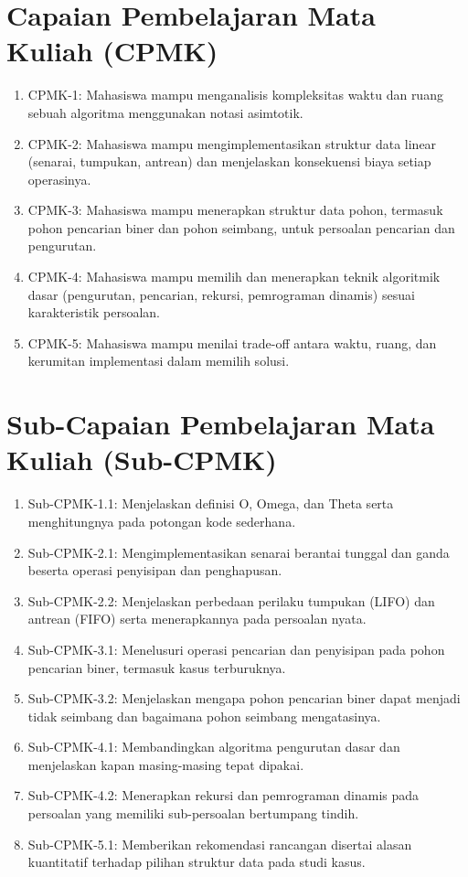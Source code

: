 \section*{Capaian Pembelajaran Mata Kuliah (CPMK)}

\begin{enumerate}
  \item CPMK-1: Mahasiswa mampu menganalisis kompleksitas waktu dan ruang
        sebuah algoritma menggunakan notasi asimtotik.
  \item CPMK-2: Mahasiswa mampu mengimplementasikan struktur data linear
        (senarai, tumpukan, antrean) dan menjelaskan konsekuensi biaya setiap
        operasinya.
  \item CPMK-3: Mahasiswa mampu menerapkan struktur data pohon, termasuk
        pohon pencarian biner dan pohon seimbang, untuk persoalan pencarian
        dan pengurutan.
  \item CPMK-4: Mahasiswa mampu memilih dan menerapkan teknik algoritmik
        dasar (pengurutan, pencarian, rekursi, pemrograman dinamis) sesuai
        karakteristik persoalan.
  \item CPMK-5: Mahasiswa mampu menilai trade-off antara waktu, ruang, dan
        kerumitan implementasi dalam memilih solusi.
\end{enumerate}

\section*{Sub-Capaian Pembelajaran Mata Kuliah (Sub-CPMK)}

\begin{enumerate}
  \item Sub-CPMK-1.1: Menjelaskan definisi O, Omega, dan Theta serta
        menghitungnya pada potongan kode sederhana.
  \item Sub-CPMK-2.1: Mengimplementasikan senarai berantai tunggal dan ganda
        beserta operasi penyisipan dan penghapusan.
  \item Sub-CPMK-2.2: Menjelaskan perbedaan perilaku tumpukan (LIFO) dan
        antrean (FIFO) serta menerapkannya pada persoalan nyata.
  \item Sub-CPMK-3.1: Menelusuri operasi pencarian dan penyisipan pada pohon
        pencarian biner, termasuk kasus terburuknya.
  \item Sub-CPMK-3.2: Menjelaskan mengapa pohon pencarian biner dapat menjadi
        tidak seimbang dan bagaimana pohon seimbang mengatasinya.
  \item Sub-CPMK-4.1: Membandingkan algoritma pengurutan dasar dan
        menjelaskan kapan masing-masing tepat dipakai.
  \item Sub-CPMK-4.2: Menerapkan rekursi dan pemrograman dinamis pada
        persoalan yang memiliki sub-persoalan bertumpang tindih.
  \item Sub-CPMK-5.1: Memberikan rekomendasi rancangan disertai alasan
        kuantitatif terhadap pilihan struktur data pada studi kasus.
\end{enumerate}

